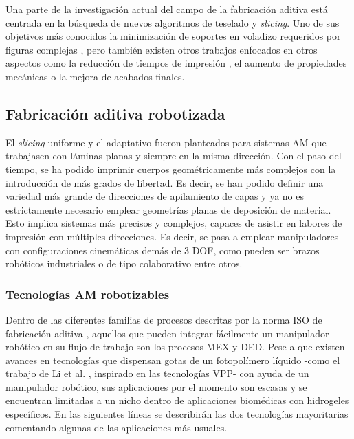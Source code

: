 Una parte de la investigación actual del campo de la fabricación aditiva está centrada en la búsqueda de nuevos algoritmos de teselado y \textit{slicing}. Uno de sus objetivos más conocidos la minimización de soportes en voladizo requeridos por figuras complejas \cite{Coupek_2018}, pero también existen otros trabajos enfocados en otros aspectos como la reducción de tiempos de impresión \cite{Karkaria_2024}, el aumento  de propiedades mecánicas \cite{Rosso_2021} o la mejora de acabados finales.

\subsection{Fabricación aditiva robotizada}
El \textit{slicing} uniforme y el adaptativo fueron planteados para sistemas \acrshort{AM} que trabajasen con láminas planas y siempre en la misma dirección. Con el paso del tiempo, se ha podido imprimir cuerpos geométricamente más complejos con la introducción de más grados de libertad. Es decir, se han podido definir una variedad más grande de direcciones de apilamiento de capas y ya no es estrictamente necesario emplear geometrías planas de deposición de material. Esto implica sistemas más precisos y complejos, capaces de asistir en labores de impresión con múltiples direcciones. Es decir, se pasa a emplear manipuladores con configuraciones cinemáticas demás de 3 \acrshort{DOF}, como pueden ser brazos robóticos industriales o de tipo colaborativo entre otros.



\subsubsection*{Tecnologías AM robotizables}
\hypertarget{Tecnologías AM robotizables}{}
Dentro de las diferentes familias de procesos descritas por la norma ISO de fabricación aditiva \cite{ISO-ASTM-52900-2022}, aquellos que pueden integrar fácilmente un manipulador robótico en su flujo de trabajo son los procesos \acrshort{MEX} y \acrshort{DED}. Pese a que existen avances en tecnologías que dispensan gotas de un fotopolímero líquido -como el trabajo de Li et al. \cite{Li_2017}, inspirado en las tecnologías \acrshort{VPP}-  con ayuda de un manipulador robótico, sus aplicaciones por el momento son escasas y se encuentran limitadas a un nicho dentro de aplicaciones biomédicas con hidrogeles específicos. En las siguientes líneas se describirán las dos tecnologías mayoritarias comentando algunas de las aplicaciones más usuales.

